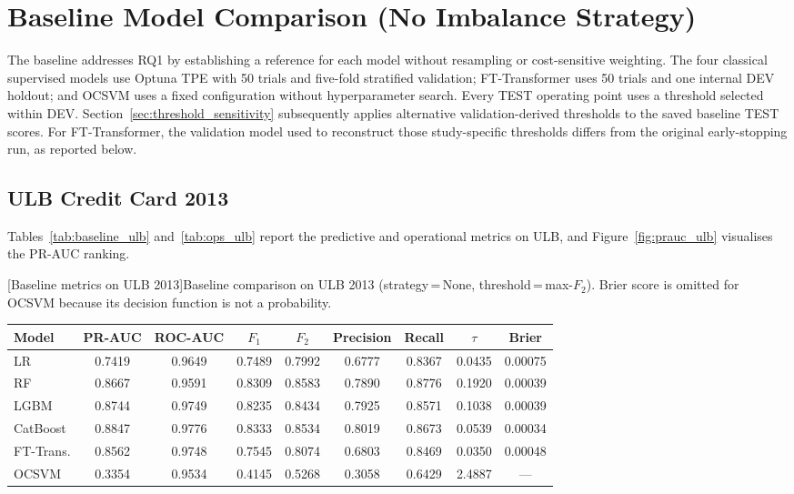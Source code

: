 
\section{Baseline Model Comparison (No Imbalance Strategy)}
\label{sec:baseline_results}

The baseline addresses RQ1 by establishing a reference for each model without resampling or cost-sensitive weighting. The four classical supervised models use Optuna TPE with 50 trials and five-fold stratified validation; FT-Transformer uses 50 trials and one internal DEV holdout; and OCSVM uses a fixed configuration without hyperparameter search. Every TEST operating point uses a threshold selected within DEV. Section~\ref{sec:threshold_sensitivity} subsequently applies alternative validation-derived thresholds to the saved baseline TEST scores. For FT-Transformer, the validation model used to reconstruct those study-specific thresholds differs from the original early-stopping run, as reported below.


\subsection{ULB Credit Card 2013}

Tables~\ref{tab:baseline_ulb} and~\ref{tab:ops_ulb} report the predictive and operational metrics on ULB, and Figure~\ref{fig:prauc_ulb} visualises the PR-AUC ranking.

\noindent\begin{minipage}{\linewidth}\centering
{}[Baseline metrics on ULB 2013]{Baseline comparison on ULB 2013 (strategy\,=\,None, threshold\,=\,max-$F_2$). Brier score is omitted for OCSVM because its decision function is not a probability.}
\label{tab:baseline_ulb}
\begin{tabular}{l c c c c c c c c}
\toprule
Model & PR-AUC & ROC-AUC & $F_1$ & $F_2$ & Precision & Recall & $\tau$ & Brier \\
\midrule
LR         & 0.7419 & 0.9649 & 0.7489 & 0.7992 & 0.6777 & 0.8367 & 0.0435 & 0.00075 \\
RF         & 0.8667 & 0.9591 & 0.8309 & 0.8583 & 0.7890 & 0.8776 & 0.1920 & 0.00039 \\
LGBM       & 0.8744 & 0.9749 & 0.8235 & 0.8434 & 0.7925 & 0.8571 & 0.1038 & 0.00039 \\
CatBoost   & 0.8847 & 0.9776 & 0.8333 & 0.8534 & 0.8019 & 0.8673 & 0.0539 & 0.00034 \\
FT-Trans.  & 0.8562 & 0.9748 & 0.7545 & 0.8074 & 0.6803 & 0.8469 & 0.0350 & 0.00048 \\
OCSVM      & 0.3354 & 0.9534 & 0.4145 & 0.5268 & 0.3058 & 0.6429 & 2.4887 & --- \\
\bottomrule
\end{tabular}
\end{minipage}

